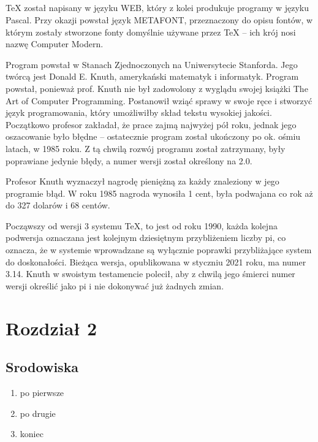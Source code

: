 \documentclass[a4paper,12pt]{scrbook}
\begin{document}
\section{}

\normalsize{TeX został napisany w języku WEB, który z kolei produkuje programy w języku Pascal. Przy okazji powstał język METAFONT, przeznaczony do opisu fontów, w którym zostały stworzone fonty domyślnie używane przez TeX – ich krój nosi nazwę Computer Modern.

Program powstał w Stanach Zjednoczonych na Uniwersytecie Stanforda. Jego twórcą jest Donald E. Knuth, amerykański matematyk i informatyk. Program powstał, ponieważ prof. Knuth nie był zadowolony z wyglądu swojej książki The Art of Computer Programming. Postanowił wziąć sprawy w swoje ręce i stworzyć język programowania, który umożliwiłby skład tekstu wysokiej jakości. Początkowo profesor zakładał, że prace zajmą najwyżej pół roku, jednak jego oszacowanie było błędne – ostatecznie program został ukończony po ok. ośmiu latach, w 1985 roku. Z tą chwilą rozwój programu został zatrzymany, były poprawiane jedynie błędy, a numer wersji został określony na 2.0.

Profesor Knuth wyznaczył nagrodę pieniężną za każdy znaleziony w jego programie błąd. W roku 1985 nagroda wynosiła 1 cent, była podwajana co rok aż do 327 dolarów i 68 centów.

Począwszy od wersji 3 systemu TeX, to jest od roku 1990, każda kolejna podwersja oznaczana jest kolejnym dziesiętnym przybliżeniem liczby pi, co oznacza, że w systemie wprowadzane są wyłącznie poprawki przybliżające system do doskonałości. Bieżąca wersja, opublikowana w styczniu 2021 roku, ma numer 3.14. Knuth w swoistym testamencie polecił, aby z chwilą jego śmierci numer wersji określić jako pi i nie dokonywać już żadnych zmian.



\chapter{Rozdział 2}
\section{Srodowiska}
\begin{enumerate}
\subsection{Wyliczenia}
\item po pierwsze
\item po drugie
\item koniec
\end{enumerate}

}
\end{document}
